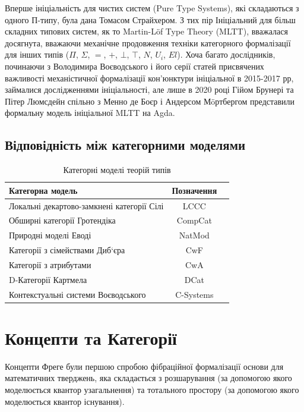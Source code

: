 Вперше ініціальність для чистих систем (Pure Type Systems), які складаються з одного П-типу,
була дана Томасом Страйхером. З тих пір Ініціальний для більш складних
типових систем, як то Martin-Löf Type Theory (MLTT), вважалася досягнута, вважаючи
механічне продовження техніки категорного формалізації для інших типів ($\Pi$, $\Sigma$, $=$, $+$, $\bot$, $\top$, $N$, $U_i$, $El$).
Хоча багато дослідників, починаючи з Володимира Воєводського і його серії статей
присвячених важливості механістичної формалізації кон'юнктури ініціальної в 2015-2017 рр,
займалися дослідженнями ініціальності, але лише в 2020 році Гійом Брунері та Пітер Люмсдейн
спільно з Менно де Боєр і Андерсом Мöртбергом представили формальну модель ініціальної
MLTT на Agda.

\subsection{Відповідність між категорними моделями}

\begin{table}[ht]
 \caption{Категорні моделі теорій типів}
  \begin{tabular}{lcc}
    \hline
       \textbf{Категорна модель} & \textbf{Позначення} \\
    \hline
 Локальні декартово-замкнені категорії Сілі & LCCC \\
 Обширні категорії Гротендіка               & CompCat \\
 Природні моделі Еводі                      & NatMod \\
 Категорії з сімействами Диб`єра            & CwF \\
 Категорії з атрибутами                     & CwA \\
 D-Категорії Картмела                       & DCat \\
 Контекстуальні системи Воєводського        & C-Systems \\
    \hline
  \end{tabular}
\end{table}

\newpage
\section{Концепти та Категорії}
Концепти Фреге були першою спробою фібраційної формалізації основи для математичних тверджень,
яка складається з розшарування (за допомогою якого моделюється квантор узагальнення) та
тотального простору (за допомогою якого моделюється квантор існування).

